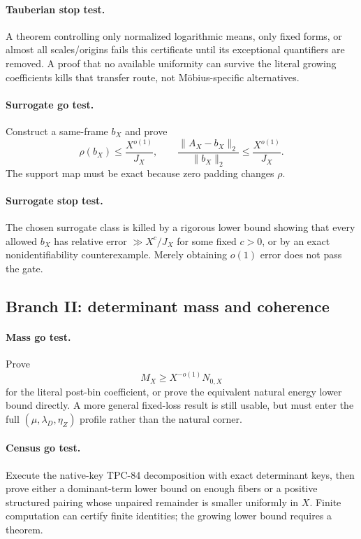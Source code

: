 \paragraph{Tauberian stop test.}
A theorem controlling only normalized logarithmic means, only fixed
forms, or almost all scales/origins fails this certificate until its
exceptional quantifiers are removed.  A proof that no available
uniformity can survive the literal growing coefficients kills that
transfer route, not M\"obius-specific alternatives.

\paragraph{Surrogate go test.}
Construct a same-frame \(b_X\) and prove
\[
 \rho(b_X)\le\frac{X^{o(1)}}{J_X},
\qquad
 \frac{\|A_X-b_X\|_2}{\|b_X\|_2}
 \le\frac{X^{o(1)}}{J_X}.
\]
The support map must be exact because zero padding changes \(\rho\).

\paragraph{Surrogate stop test.}
The chosen surrogate class is killed by a rigorous lower bound showing
that every allowed \(b_X\) has relative error
\(\gg X^c/J_X\) for some fixed \(c>0\), or by an exact
nonidentifiability counterexample.  Merely obtaining \(o(1)\) error
does not pass the gate.

\subsection{Branch II: determinant mass and coherence}

\paragraph{Mass go test.}
Prove
\[
 M_X\ge X^{-o(1)}N_{0,X}
\]
for the literal post-bin coefficient, or prove the equivalent natural
energy lower bound directly.  A more general fixed-loss result is
still usable, but must enter the full
\((\mu,\lambda_D,\eta_Z)\) profile rather than the natural corner.

\paragraph{Census go test.}
Execute the native-key TPC-84 decomposition with exact determinant
keys, then prove either a dominant-term lower bound on enough fibers
or a positive structured pairing whose unpaired remainder is smaller
uniformly in \(X\).  Finite computation can certify finite identities;
the growing lower bound requires a theorem.

